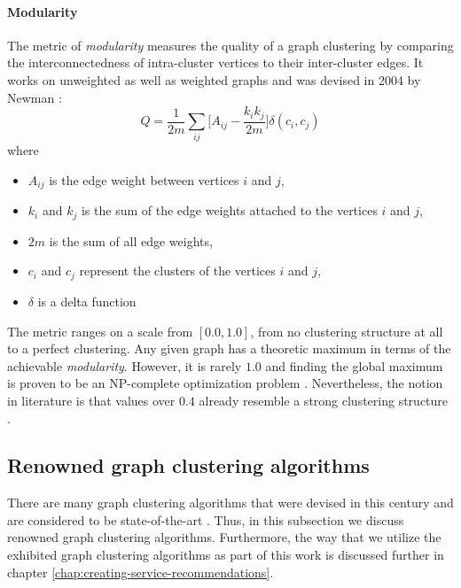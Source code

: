 \documentclass[12pt,a4paper]{report}
\begin{document}
\paragraph{Modularity}
The metric of \textit{modularity} measures the quality of a graph clustering
by comparing the interconnectedness of intra-cluster vertices to their
inter-cluster edges. It works on unweighted as well as weighted graphs
\cite{clauset2004modularity, blondel2008modularity}
and was devised in 2004 by Newman \cite{newman2004fast}:
\[
  Q =
  \frac{1}{2m}
  \sum \limits _{ij}{\bigg[ A_{ij} - \frac{k_i k_j}{2m} \bigg]}
  \delta (c_i, c_j)
\]
where
\begin{itemize}[noitemsep]
  \item \(A_{ij}\) is the edge weight between vertices \(i\) and \(j\),
  \item \(k_i\) and \(k_j\) is the sum of the edge weights attached to
        the vertices \(i\) and \(j\),
  \item \(2m\) is the sum of all edge weights,
  \item \(c_i\) and \(c_j\) represent the clusters of the vertices \(i\) and \(j\),
  \item \(\delta\) is a delta function
\end{itemize}
The metric ranges on a scale from \([0.0, 1.0]\), from no clustering structure
at all to a perfect clustering. Any given graph has a theoretic maximum in terms
of the achievable \textit{modularity}. However, it is rarely \(1.0\) and finding
the global maximum is proven to be an NP-complete optimization problem
\cite{brandes2006maximizing}. Nevertheless, the notion in literature is that
values over \(0.4\) already resemble a strong clustering structure
\cite{newman2004fast, fortunato2007resolution}.


\subsection{Renowned graph clustering algorithms} \label{subsect:renowned-graph-clustering-algorithms}

There are many graph clustering algorithms that were devised in this century
and are considered to be state-of-the-art
\cite{lancichinetti2009community, fortunato2010community, danon2005comparing}.
Thus, in this subsection we discuss renowned graph clustering algorithms.
Furthermore, the way that we utilize the exhibited graph clustering algorithms
as part of this work is discussed further in chapter
\ref{chap:creating-service-recommendations}.
\end{document}
